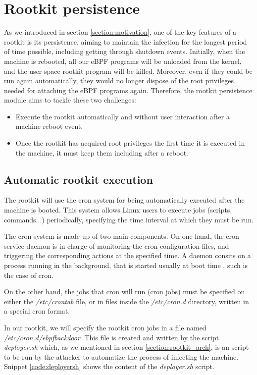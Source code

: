 \section{Rootkit persistence} \label{section:persistence}
As we introduced in section \ref{section:motivation}, one of the key features of a rootkit is its persistence, aiming to maintain the infection for the longest period of time possible, including getting through shutdown events. Initially, when the machine is rebooted, all our eBPF programs will be unloaded from the kernel, and the user space rootkit program will be killed. Moreover, even if they could be run again automatically, they would no longer dispose of the root privileges needed for attaching the eBPF programs again. Therefore, the rootkit persistence module aims to tackle these two challenges:
\begin{itemize}
\item Execute the rootkit automatically and without user interaction after a machine reboot event.
\item Once the rootkit has acquired root privileges the first time it is executed in the machine, it must keep them including after a reboot.
\end{itemize}

\subsection{Automatic rootkit execution}
The rootkit will use the cron system \cite{cron} for being automatically executed after the machine is booted. This system allows Linux users to execute jobs (scripts, commands...) periodically, specifying the time interval at which they must be run. 

The cron system is made up of two main components. On one hand, the cron service daemon is in charge of monitoring the cron configuration files, and triggering the corresponding actions at the specified time. A daemon consits on a process running in the background, that is started usually at boot time \cite{linux_daemons}, such is the case of cron.

On the other hand, the jobs that cron will run (cron jobs) must be specified on either the \textit{/etc/crontab} file, or in files inside the \textit{/etc/cron.d} directory, written in a special cron format. 

In our rootkit, we will specify the rootkit cron jobs in a file named \textit{/etc/cron.d/ebpfbackdoor}. This file is created and written by the script \textit{deployer.sh} which, as we mentioned in section \ref{section:rootkit_arch}, is an script to be run by the attacker to automatize the process of infecting the machine. Snippet \ref{code:deployersh} shows the content of the \textit{deployer.sh} script.

